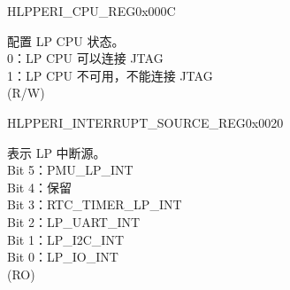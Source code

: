 \begin{register}{H}{LPPERI\_CPU\_REG}{0x000C}\label{regdesc:LPPERICPUREG}
%
%
\regnewline%
\begin{regdesc}\begin{reglist}
\label{fielddesc:LPPERILPCOREDBGMUNAVALIABLE}\item [LPPERI\_LPCORE\_DBGM\_UNAVALIABLE] 配置 LP CPU 状态。\\
0：LP CPU 可以连接 JTAG\\
1：LP CPU 不可用，不能连接 JTAG\\
(R/W)
\end{reglist}\end{regdesc}
\end{register}


\begin{register}{H}{LPPERI\_INTERRUPT\_SOURCE\_REG}{0x0020}\label{regdesc:LPPERIINTERRUPTSOURCEREG}
%
%
\regnewline%
\begin{regdesc}\begin{reglist}
\label{fielddesc:LPPERILPINTERRUPTSOURCE}\item [LPPERI\_LP\_INTERRUPT\_SOURCE] 表示 LP 中断源。\\
Bit 5：PMU\_LP\_INT\\
Bit 4：保留\\
Bit 3：RTC\_TIMER\_LP\_INT\\
Bit 2：LP\_UART\_INT\\
Bit 1：LP\_I2C\_INT\\
Bit 0：LP\_IO\_INT\\
(RO)
\end{reglist}\end{regdesc}
\end{register}

